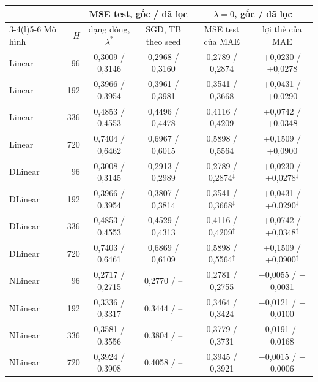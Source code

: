 \begin{tabular}{@{}lr c c c c@{}}
\toprule
 & & \multicolumn{2}{c}{MSE test, gốc / đã lọc} & \multicolumn{2}{c}{$\lambda = 0$, gốc / đã lọc} \\
\cmidrule(lr){3-4}\cmidrule(l){5-6}
Mô hình & $H$ & dạng đóng, $\lambda^*$ & SGD, TB theo seed & MSE test của MAE & lợi thế của MAE \\
\midrule
Linear & 96 & 0{,}3009 / 0{,}3146 & 0{,}2968 / 0{,}3160 & 0{,}2789 / 0{,}2874 & +0{,}0230 / +0{,}0278 \\
Linear & 192 & 0{,}3966 / 0{,}3954 & 0{,}3961 / 0{,}3981 & 0{,}3541 / 0{,}3668 & +0{,}0431 / +0{,}0290 \\
Linear & 336 & 0{,}4853 / 0{,}4553 & 0{,}4496 / 0{,}4478 & 0{,}4116 / 0{,}4209 & +0{,}0742 / +0{,}0348 \\
Linear & 720 & 0{,}7404 / 0{,}6462 & 0{,}6967 / 0{,}6015 & 0{,}5898 / 0{,}5564 & +0{,}1509 / +0{,}0900 \\
\addlinespace[2pt]
DLinear & 96 & 0{,}3008 / 0{,}3145 & 0{,}2913 / 0{,}2989 & 0{,}2789 / 0{,}2874$^\ddagger$ & +0{,}0230 / +0{,}0278$^\ddagger$ \\
DLinear & 192 & 0{,}3966 / 0{,}3954 & 0{,}3807 / 0{,}3814 & 0{,}3541 / 0{,}3668$^\ddagger$ & +0{,}0431 / +0{,}0290$^\ddagger$ \\
DLinear & 336 & 0{,}4853 / 0{,}4553 & 0{,}4529 / 0{,}4313 & 0{,}4116 / 0{,}4209$^\ddagger$ & +0{,}0742 / +0{,}0348$^\ddagger$ \\
DLinear & 720 & 0{,}7403 / 0{,}6461 & 0{,}6869 / 0{,}6109 & 0{,}5898 / 0{,}5564$^\ddagger$ & +0{,}1509 / +0{,}0900$^\ddagger$ \\
\addlinespace[2pt]
NLinear & 96 & 0{,}2717 / 0{,}2715 & 0{,}2770 / -- & 0{,}2781 / 0{,}2755 & $-$0{,}0055 / $-$0{,}0031 \\
NLinear & 192 & 0{,}3336 / 0{,}3317 & 0{,}3444 / -- & 0{,}3464 / 0{,}3424 & $-$0{,}0121 / $-$0{,}0100 \\
NLinear & 336 & 0{,}3581 / 0{,}3556 & 0{,}3804 / -- & 0{,}3779 / 0{,}3731 & $-$0{,}0191 / $-$0{,}0168 \\
NLinear & 720 & 0{,}3924 / 0{,}3908 & 0{,}4058 / -- & 0{,}3945 / 0{,}3921 & $-$0{,}0015 / $-$0{,}0006 \\
\bottomrule
\end{tabular}
